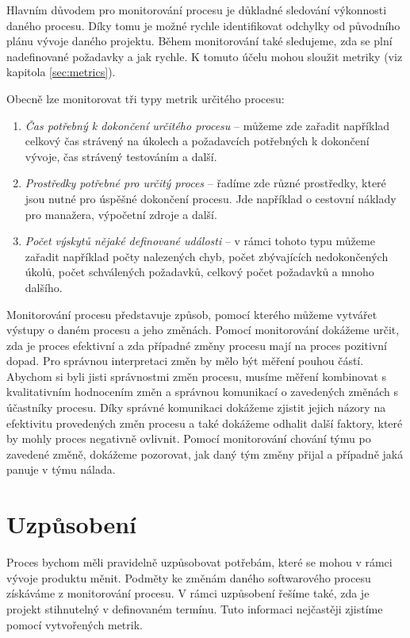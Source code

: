 \documentclass[czech,master]{diploma}
\begin{document}
Hlavním důvodem pro monitorování procesu je důkladné sledování výkonnosti daného procesu. Díky tomu je možné rychle identifikovat odchylky od původního plánu vývoje daného projektu. Během monitorování také sledujeme, zda se plní nadefinované požadavky a jak rychle. K tomuto účelu mohou sloužit metriky (viz kapitola \ref{sec:metrics}).

Obecně lze monitorovat tři typy metrik určitého procesu:

\begin{enumerate}
\item \textit{Čas potřebný k dokončení určitého procesu} -- můžeme zde zařadit například celkový čas strávený na úkolech a požadavcích potřebných k dokončení vývoje, čas strávený testováním a další.

\item \textit{Prostředky potřebné pro určitý proces} -- řadíme zde různé prostředky, které jsou nutné pro úspěšné dokončení procesu. Jde například o cestovní náklady pro manažera, výpočetní zdroje a další.

\item \textit{Počet výskytů nějaké definované události} -- v rámci tohoto typu můžeme zařadit například počty nalezených chyb, počet zbývajících nedokončených úkolů, počet schválených požadavků, celkový počet požadavků a mnoho dalšího.
\end{enumerate}

Monitorování procesu představuje způsob, pomocí kterého můžeme vytvářet výstupy o daném procesu a jeho změnách. Pomocí monitorování dokážeme určit, zda je proces efektivní a zda případné změny procesu mají na proces pozitivní dopad. Pro správnou interpretaci změn by mělo být měření pouhou částí. Abychom si byli jisti správnostmi změn procesu, musíme měření kombinovat s kvalitativním hodnocením změn a správnou komunikací o zavedených změnách s účastníky procesu. Díky správné komunikaci dokážeme zjistit jejich názory na efektivitu provedených změn procesu a také dokážeme odhalit další faktory, které by mohly proces negativně ovlivnit. Pomocí monitorování chování týmu po zavedené změně, dokážeme pozorovat, jak daný tým změny přijal a případně jaká panuje v týmu nálada.

\section{Uzpůsobení}
\label{sec:control}
Proces bychom měli pravidelně uzpůsobovat potřebám, které se mohou v rámci vývoje produktu měnit. Podměty ke změnám daného softwarového procesu získáváme z monitorování procesu. V rámci uzpůsobení řešíme také, zda je projekt stihnutelný v definovaném termínu. Tuto informaci nejčastěji zjistíme pomocí vytvořených metrik.
\end{document}
